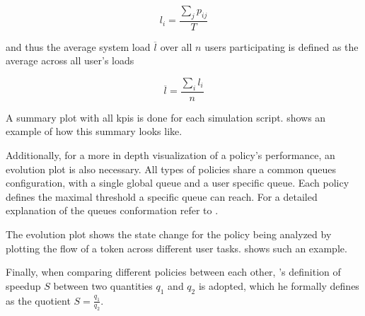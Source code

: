 \begin{equation}
	l_i=\frac{\sum_j p_{ij}}{T}
\end{equation}

and thus the average system load $\overline{l}$ over all $n$ users participating is defined as the average across all user's loads \ie

\begin{equation}
	\overline{l} = \frac{\sum_i l_i}{n}
\end{equation}

A summary plot with all \glspl{kpi} is done for each simulation script.  shows an example of how this summary looks like.


Additionally, for a more in depth visualization of a policy's performance, an evolution plot is also necessary. All types of policies share a common queues configuration, with a single global queue and a user specific queue. Each policy defines the maximal threshold a specific queue can reach. For a detailed explanation of the queues conformation refer to .

The evolution plot shows the state change for the policy being analyzed by plotting the flow of a token across different user tasks.  shows such an example.


Finally, when comparing different policies between each other, \citet{Milo2012}'s definition of speedup $S$ between two quantities $q_1$ and $q_2$ is adopted, which he formally defines as the quotient $S=\frac{q_1}{q_2}$.